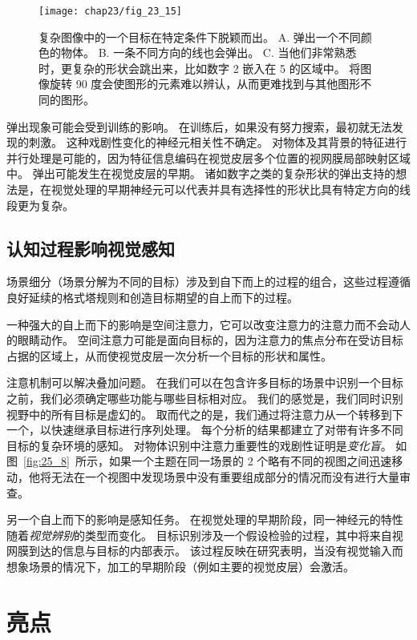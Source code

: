 \begin{figure}[htbp]
	\centering
	\texttt{[image: chap23/fig\_23\_15]}
	\caption{复杂图像中的一个目标在特定条件下脱颖而出。
		A. 弹出一个不同颜色的物体。
		B. 一条不同方向的线也会弹出。
		C. 当他们非常熟悉时，更复杂的形状会跳出来，比如数字 2 嵌入在 5 的区域中。
		将图像旋转 90 度会使图形的元素难以辨认，从而更难找到与其他图形不同的图形\cite{wang1994familiarity}。}
	\label{fig:23_15}
\end{figure}


弹出现象可能会受到训练的影响。
在训练后，如果没有努力搜索，最初就无法发现的刺激。 
这种戏剧性变化的神经元相关性不确定。
对物体及其背景的特征进行并行处理是可能的，因为特征信息编码在视觉皮层多个位置的视网膜局部映射区域中。
弹出可能发生在视觉皮层的早期。
诸如数字之类的复杂形状的弹出支持的想法是，在视觉处理的早期神经元可以代表并具有选择性的形状比具有特定方向的线段更为复杂。



\subsection{认知过程影响视觉感知}

场景细分（场景分解为不同的目标）涉及到自下而上的过程的组合，这些过程遵循良好延续的格式塔规则和创造目标期望的自上而下的过程。


一种强大的自上而下的影响是空间注意力，它可以改变注意力的注意力而不会动人的眼睛动作。
空间注意力可能是面向目标的，因为注意力的焦点分布在受访目标占据的区域上，从而使视觉皮层一次分析一个目标的形状和属性。


注意机制可以解决叠加问题。
在我们可以在包含许多目标的场景中识别一个目标之前，我们必须确定哪些功能与哪些目标相对应。
我们的感觉是，我们同时识别视野中的所有目标是虚幻的。
取而代之的是，我们通过将注意力从一个转移到下一个，以快速继承目标进行序列处理。
每个分析的结果都建立了对带有许多不同目标的复杂环境的感知。
对物体识别中注意力重要性的戏剧性证明是\textit{变化盲}。
如图~\ref{fig:25_8}~所示，如果一个主题在同一场景的 2 个略有不同的视图之间迅速移动，他将无法在一个视图中发现场景中没有重要组成部分的情况而没有进行大量审查。


另一个自上而下的影响是感知任务。
在视觉处理的早期阶段，同一神经元的特性随着\textit{视觉辨别}的类型而变化。
目标识别涉及一个假设检验的过程，其中将来自视网膜到达的信息与目标的内部表示。
该过程反映在研究表明，当没有视觉输入而想象场景的情况下，加工的早期阶段（例如主要的视觉皮层）会激活。



\section{亮点}

